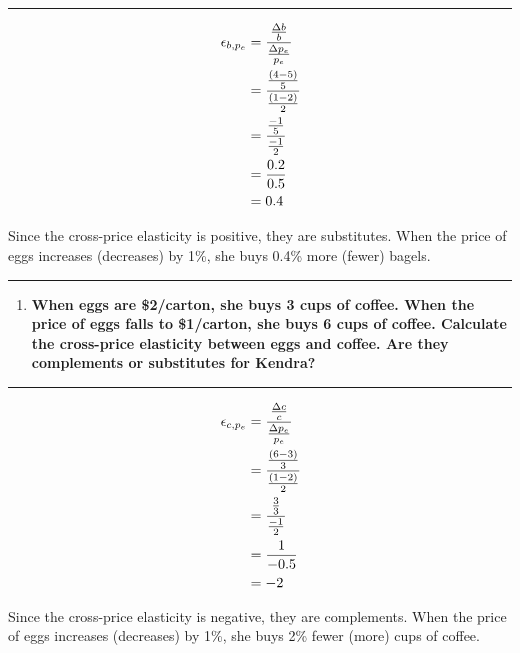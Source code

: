 \documentclass[
  11pt,
]{article}
\providecommand{\tightlist}{%
  \setlength{\itemsep}{0pt}\setlength{\parskip}{0pt}}
\begin{document}
\begin{center}\rule{0.5\linewidth}{0.5pt}\end{center}

\[\begin{aligned}
    \epsilon_{b,p_e}&=\cfrac{\frac{\Delta b}{b}}{\frac{\Delta p_e}{p_e}}\\
    &=\cfrac{\frac{(4-5)}{5}}{\frac{(1-2)}{2}}\\
    &=\cfrac{\frac{-1}{5}}{\frac{-1}{2}}\\
    &=\frac{0.2}{0.5}\\
    &=0.4\\
    \end{aligned}\]

Since the cross-price elasticity is positive, they are substitutes. When
the price of eggs increases (decreases) by 1\%, she buys 0.4\% more
(fewer) bagels.

\begin{center}\rule{0.5\linewidth}{0.5pt}\end{center}

\begin{enumerate}
\def\labelenumi{\alph{enumi}.}
\setcounter{enumi}{1}
\tightlist
\item
  \textbf{When eggs are \$2/carton, she buys 3 cups of coffee. When the
  price of eggs falls to \$1/carton, she buys 6 cups of coffee.
  Calculate the cross-price elasticity between eggs and coffee. Are they
  complements or substitutes for Kendra?}
\end{enumerate}

\begin{center}\rule{0.5\linewidth}{0.5pt}\end{center}

\[\begin{aligned}
    \epsilon_{c,p_e}&=\cfrac{\frac{\Delta c}{c}}{\frac{\Delta p_e}{p_e}}\\
    &=\cfrac{\frac{(6-3)}{3}}{\frac{(1-2)}{2}}\\
    &=\cfrac{\frac{3}{3}}{\frac{-1}{2}}\\
    &=\frac{1}{-0.5}\\
    &=-2\\
    \end{aligned}\]

Since the cross-price elasticity is negative, they are complements. When
the price of eggs increases (decreases) by 1\%, she buys 2\% fewer
(more) cups of coffee.

\clearpage
\end{document}
